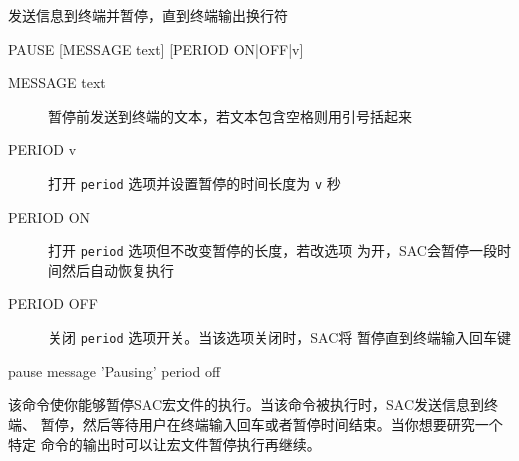 \label{cmd:pause}

发送信息到终端并暂停，直到终端输出换行符

\begin{SACSTX}
PAUSE [MESSAGE text] [PERIOD ON|OFF|v]
\end{SACSTX}

\begin{description}
\item [MESSAGE text] 暂停前发送到终端的文本，若文本包含空格则用引号括起来
\item [PERIOD v] 打开 \texttt{period} 选项并设置暂停的时间长度为 \texttt{v} 秒
\item [PERIOD ON] 打开 \texttt{period} 选项但不改变暂停的长度，若改选项
    为开，SAC会暂停一段时间然后自动恢复执行
\item [PERIOD OFF] 关闭 \texttt{period} 选项开关。当该选项关闭时，SAC将
    暂停直到终端输入回车键
\end{description}

\begin{SACDFT}
pause message 'Pausing' period off
\end{SACDFT}

该命令使你能够暂停SAC宏文件的执行。当该命令被执行时，SAC发送信息到终端、
暂停，然后等待用户在终端输入回车或者暂停时间结束。当你想要研究一个特定
命令的输出时可以让宏文件暂停执行再继续。
